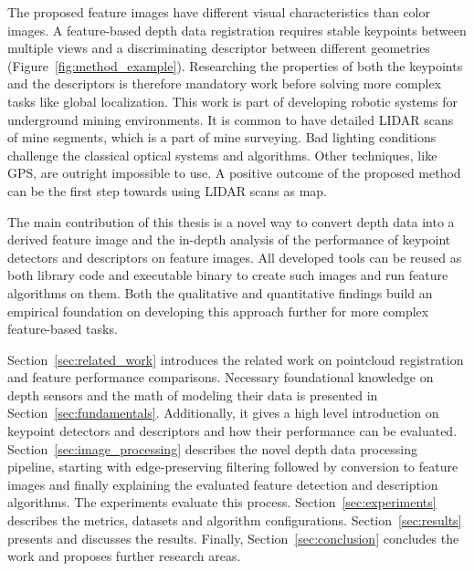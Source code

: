 The proposed feature images have different visual characteristics than color images.
A \gls{feature}-based depth data registration requires stable keypoints between multiple views and a discriminating descriptor between different geometries (Figure~\ref{fig:method_example}).
Researching the properties of both the keypoints and the descriptors is therefore mandatory work before solving more complex tasks like global localization.
This work is part of developing robotic systems for underground mining environments.
It is common to have detailed \acrshort{LIDAR} scans of mine segments, which is a part of mine surveying.
Bad lighting conditions challenge the classical optical systems and algorithms.
Other techniques, like GPS, are outright impossible to use.
A positive outcome of the proposed method can be the first step towards using \acrshort{LIDAR} scans as map.

The main contribution of this thesis is a novel way to convert depth data into a derived feature image and the in-depth analysis of the performance of keypoint detectors and descriptors on feature images.
All developed tools can be reused as both library code and executable binary to create such images and run \gls{feature} algorithms on them.
Both the qualitative and quantitative findings build an empirical foundation on developing this approach further for more complex feature-based tasks.

Section~\ref{sec:related_work} introduces the related work on pointcloud registration and \gls{feature} performance comparisons.
Necessary foundational knowledge on depth sensors and the math of modeling their data is presented in Section~\ref{sec:fundamentals}.
Additionally, it gives a high level introduction on keypoint detectors and descriptors and how their performance can be evaluated.
Section~\ref{sec:image_processing} describes the novel depth data processing pipeline, starting with edge-preserving filtering followed by conversion to feature images and finally explaining the evaluated \gls{feature} detection and description algorithms.
The experiments evaluate this process.
Section~\ref{sec:experiments} describes the metrics, datasets and algorithm configurations.
Section~\ref{sec:results} presents and discusses the results.
Finally, Section~\ref{sec:conclusion} concludes the work and proposes further research areas.
